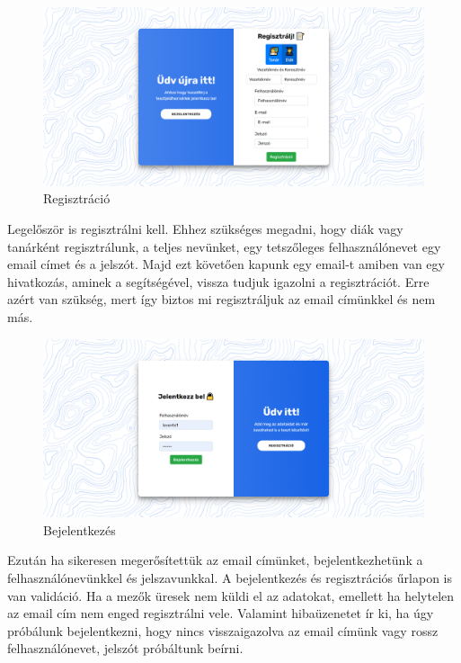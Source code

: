 \begin{figure}[H]
    \centering
    \includegraphics[width=\linewidth]{images/signin.png}
    \caption{Regisztráció}
    \label{fig:signin}
\end{figure}


Legelőször is regisztrálni  kell. Ehhez szükséges megadni, hogy diák vagy tanárként regisztrálunk, a teljes nevünket, egy tetszőleges felhasználónevet egy email címet és a jelszót. Majd ezt követően kapunk egy email-t amiben van egy hivatkozás, aminek a segítségével, vissza tudjuk igazolni a regisztrációt. Erre azért van szükség, mert így biztos mi regisztráljuk az email címünkkel és nem más.

\begin{figure}[H]
    \centering
    \includegraphics[width=\linewidth]{images/login.png}
    \caption{Bejelentkezés}
    \label{fig:login}
\end{figure}

Ezután ha sikeresen megerősítettük az email címünket, bejelentkezhetünk  a felhasználónevünkkel és jelszavunkkal.
A bejelentkezés és regisztrációs űrlapon is van validáció. Ha a mezők üresek nem küldi el az adatokat, emellett ha helytelen az email cím nem enged regisztrálni vele. Valamint hibaüzenetet ír ki, ha úgy próbálunk bejelentkezni, hogy nincs visszaigazolva az email címünk vagy rossz felhasználónevet, jelszót próbáltunk beírni.

